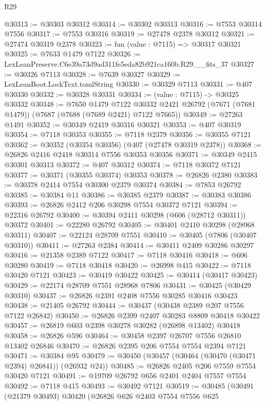 \begin{lexlean}{R29}
\begin{coremodule}
@30313 := @30303 @30312
@30314 := @30302 @30313
@30316 := @7553 @30314 @7556
@30317 := @7553 @30316
@30319 := @27478 @2378 @30312
@30321 := @27474 @30319 @2378
@30323 := fun (value : @7115) => @30317 @30321
@30325 := @7633 @1479 @7122
@30326 := LexLeanPreserve.C6e39a73d9ad311fe5eda82b921ca160b.R29.__fits_37
@30327 := @30326 @7113
@30328 := @7639 @30327
@30329 := LexLeanBoot.LockText.tomlString
@30330 := @30329 @7113
@30331 := @407 @30330
@30332 := @30328 @30331
@30334 := (value : @7115) -> @30325 @30332
@30348 := @7650
    @1479
    @7122
    @30332
    @2421
    @26792
    (@7671 (@7681 @1479))
    (@7687 (@7688 (@7689 @2421) @7122 @7665))
@30349 := @27263 @1491
@30352 := @30349 @2419 @30316 @30321
@30353 := @407 @30319
@30354 := @7118 @30353
@30355 := @7118 @2379
@30356 := @30355 @7121
@30362 := @30352 (@30354 @30356) (@407 (@27478 @30319 @2378))
@30368 := @26826 @2416 @2418 @30314 @7556 @30353 @30356
@30371 := @30349 @2415 @30301 @30313
@30372 := @407 @30312
@30374 := @7118 @30372 @7121
@30377 := @30371 (@30355 @30374) @30353
@30378 := @26826 @2380
@30383 := @30378 @2414 @7554 @30300 @2379 @30374
@30384 := @7853 @26792
@30385 := @30384 @11
@30386 := @30385 @2379
@30387 := @30383 @30386
@30393 := @26826 @2412 @206 @30298 @7554 @30372 @7121
@30394 := @22316 @26792
@30400 := @30394 @2411 @30298 (@606 (@28712 @30311)) @30372
@30401 := @22280 @26792
@30405 := @30401 @2410 @30298 (@28968 @30311)
@30407 := @22124 @28709 @7551
@30410 := @30405 (@7806 (@30407 @30310))
@30411 := @27263 @2384
@30414 := @30411 @2409 @30286 @30297
@30416 := @21358 @2389 @7122
@30417 := @7118 @30416
@30418 := @606 @30280
@30419 := @7118 @30418
@30420 := @26998 @415
@30422 := @7118 @30420 @7121
@30423 := @30419 @30422
@30425 := @30414 (@30417 @30423)
@30429 := @22174 @28709 @7551 @28968 @7806
@30431 := @30425 (@30429 @30310)
@30437 := @26826 @2391 @2408 @7556 @30285 @30416 @30423
@30438 := @21405 @26792
@30444 := @30437 (@30438 @2389 @207 @7556 @7122 @26842)
@30450 := @26826 @2399 @2407 @30283 @8809 @30418 @30422
@30457 := @26819 @603 @2398 @30278 @30282 (@26898 @13402) @30418
@30458 := @26826 @596
@30464 := @30458 @2397 @26707 @7556 @26810 @13402 @26846
@30470 := @26826 @2395 @206 @7554 @7554 @2394 @7121
@30471 := @30384 @95
@30479 := @30450 (@30457 (@30464 (@30470 (@30471 @2394) @26841)) (@26932 @24))
@30485 := @26826 @2405 @206 @7559 @7554 @30420 @7121
@30491 := @19709 @26792 @656 @2401 @2404 @7557 @7554
@30492 := @7118 @415
@30493 := @30492 @7121
@30519 := @30485
    (@30491
      (@21379 @30493)
      @30420
      (@26826
        @626
        @2403
        @7554
        @7556
        @625

\end{coremodule}
\end{lexlean}

